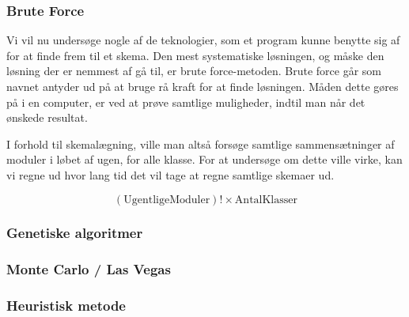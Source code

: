 \subsubsection{Brute Force}
Vi vil nu undersøge nogle af de teknologier, som et program kunne benytte sig af for at finde frem til et skema. Den mest systematiske løsningen, og måske den løsning der er nemmest af gå til, er brute force-metoden. Brute force går som navnet antyder ud på at bruge rå kraft for at finde løsningen. Måden dette gøres på i en computer, er ved at prøve samtlige muligheder, indtil man når det ønskede resultat.

I forhold til skemalægning, ville man altså forsøge samtlige sammensætninger af moduler i løbet af ugen, for alle klasse. For at undersøge om dette ville virke, kan vi regne ud hvor lang tid det vil tage at regne samtlige skemaer ud.

$$ (\text{UgentligeModuler})! \times \text{AntalKlasser} $$
\subsubsection{Genetiske algoritmer}
\subsubsection{Monte Carlo / Las Vegas}
\subsubsection{Heuristisk metode}
